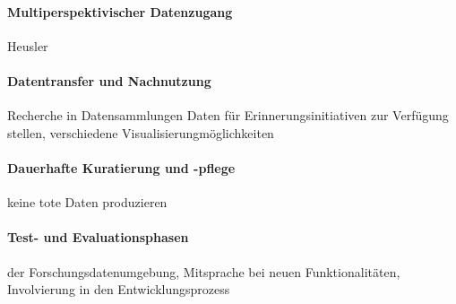 \paragraph{Multiperspektivischer Datenzugang}
Heusler

\paragraph{Datentransfer und Nachnutzung}
Recherche in Datensammlungen
Daten für Erinnerungsinitiativen zur Verfügung stellen, verschiedene Visualisierungmöglichkeiten

\paragraph{Dauerhafte Kuratierung und -pflege}
keine tote Daten produzieren

\paragraph{Test- und Evaluationsphasen}
der Forschungsdatenumgebung, Mitsprache bei neuen Funktionalitäten, Involvierung in den Entwicklungsprozess